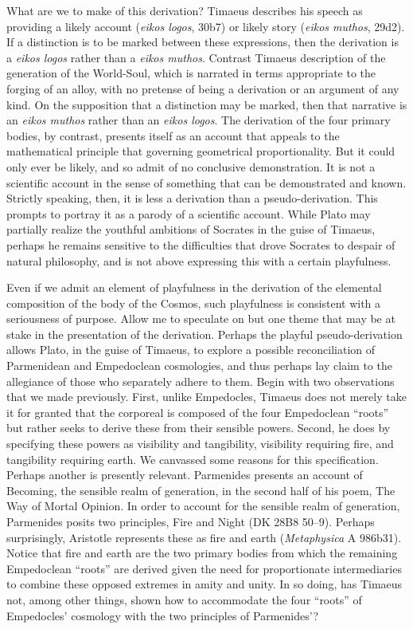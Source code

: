 What are we to make of this derivation? Timaeus describes his speech as providing a likely account (\emph{eikos logos}, 30b7) or likely story (\emph{eikos muthos}, 29d2). If a distinction is to be marked between these expressions, then the derivation is a \emph{eikos logos} rather than a \emph{eikos muthos}. Contrast Timaeus description of the generation of the World-Soul, which is narrated in terms appropriate to the forging of an alloy, with no pretense of being a derivation or an argument of any kind. On the supposition that a distinction may be marked, then that narrative is an \emph{eikos muthos} rather than an \emph{eikos logos}. The derivation of the four primary bodies, by contrast, presents itself as an account that appeals to the mathematical principle that governing geometrical proportionality. But it could only ever be likely, and so admit of no conclusive demonstration. It is not a scientific account in the sense of something that can be demonstrated and known. Strictly speaking, then, it is less a derivation than a pseudo-derivation. This prompts \citet{Prtichard:1990aa} to portray it as a parody of a scientific account. While Plato may partially realize the youthful ambitions of Socrates in the guise of Timaeus, perhaps he remains sensitive to the difficulties that drove Socrates to despair of natural philosophy, and is not above expressing this with a certain playfulness.

Even if we admit an element of playfulness in the derivation of the elemental composition of the body of the Cosmos, such playfulness is consistent with a seriousness of purpose. Allow me to speculate on but one theme that may be at stake in the presentation of the derivation. Perhaps the playful pseudo-derivation allows Plato, in the guise of Timaeus, to explore a possible reconciliation of Parmenidean and Empedoclean cosmologies, and thus perhaps lay claim to the allegiance of those who separately adhere to them. Begin with two observations that we made previously. First, unlike Empedocles, Timaeus does not merely take it for granted that the corporeal is composed of the four Empedoclean ``roots'' but rather seeks to derive these from their sensible powers. Second, he does by specifying these powers as visibility and tangibility, visibility requiring fire, and tangibility requiring earth. We canvassed some reasons for this specification. Perhaps another is presently relevant. Parmenides presents an account of Becoming, the sensible realm of generation, in the second half of his poem, The Way of Mortal Opinion. In order to account for the sensible realm of generation, Parmenides posits two principles, Fire and Night (DK 28B8 50--9). Perhaps surprisingly, Aristotle represents these as fire and earth (\emph{Metaphysica} A 986b31). Notice that fire and earth are the two primary bodies from which the remaining Empedoclean ``roots'' are derived given the need for proportionate intermediaries to combine these opposed extremes in amity and unity. In so doing, has Timaeus not, among other things, shown how to accommodate the four ``roots'' of Empedocles' cosmology with the two principles of Parmenides'? 

